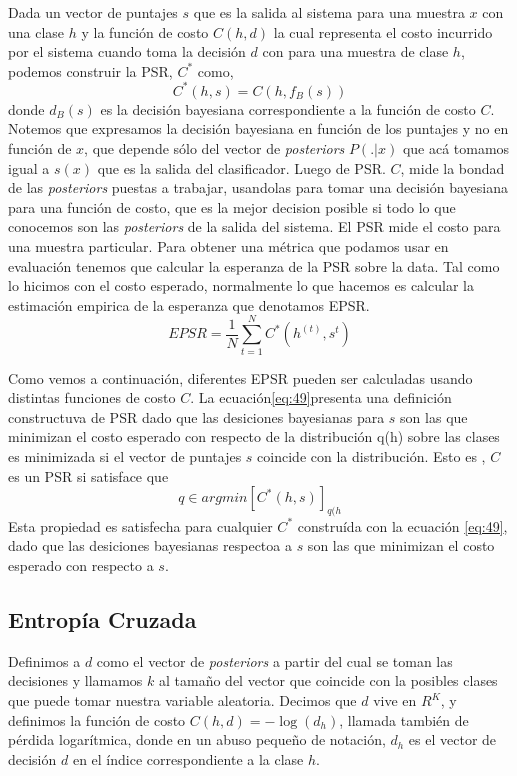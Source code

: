 \documentclass[11pt,a4paper,twoside]{tesis}
\begin{document}
Dada un vector de puntajes $s$ que es la salida al sistema para una muestra $x$ con una clase $h$ y la función de costo $C(h,d)$ la cual representa el costo incurrido por el sistema cuando toma la decisión $d$ con para una muestra de clase $h$, podemos construir la PSR, $C^*$ como, 
\begin{equation}
    C^*(h,s)=C(h,f_B(s))
    \label{eq:49}     
\end{equation}
donde $d_B(s)$ es la decisión bayesiana correspondiente a la función de costo $C$. Notemos que expresamos la decisión bayesiana en función de los puntajes y no en función de $x$, que depende sólo del vector de \textit{posteriors} $P(.|x)$ que acá tomamos igual a $s(x)$ que es la salida del clasificador. Luego de PSR. $C$, mide la bondad de las \textit{posteriors} puestas a trabajar, usandolas para tomar una decisión bayesiana para una función de costo, que es la mejor decision posible si todo lo que conocemos son las \textit{posteriors} de la salida del sistema.
El PSR mide el costo para una muestra particular. Para obtener una métrica que podamos usar en evaluación tenemos que calcular la esperanza de la PSR sobre la data. Tal como lo hicimos con el costo esperado, normalmente lo que hacemos es calcular la estimación empirica de la esperanza que denotamos EPSR.
\begin{equation}
EPSR = \frac{1}{N} \sum_{t=1}^N C^*(h^{(t)}, s^{t}) 
\label{eq:50}     
\end{equation}

Como vemos a continuación, diferentes EPSR pueden ser calculadas usando distintas funciones de costo $C$. 
La ecuación\ref{eq:49}presenta una definición constructuva de PSR dado que las desiciones bayesianas para $s$ son las que minimizan el costo esperado con respecto de la distribución q(h) sobre las clases es minimizada si el vector de puntajes $s$ coincide con la distribución. Esto es , $C$ es un PSR si satisface que
\begin{equation}
    q \in argmin [C^*(h,s)]_{q(h}
\end{equation}
Esta propiedad es satisfecha para cualquier $C^*$ construída con la ecuación \ref{eq:49}, dado que las desiciones bayesianas respectoa a $s$ son las que minimizan el costo esperado con respecto a $s$.

\subsection{Entropía Cruzada}

Definimos a $d$ como el vector de \textit{posteriors} a partir del cual se toman las decisiones y llamamos $k$ al tamaño del vector que coincide con la posibles clases que puede tomar nuestra variable aleatoria. Decimos que $d$ vive en ${R}^K$,  y definimos la función de costo $C(h,d)=-\log (d_{h})$, llamada también de pérdida logarítmica, donde en un abuso pequeño de notación, $d_h$ es el vector de decisión $d$ en el índice correspondiente a la clase $h$. 
\end{document}
